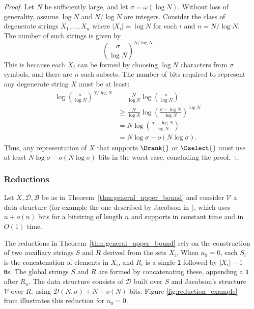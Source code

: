 \begin{proof}
    Let $N$ be sufficiently large, and let $\sigma = \omega(\log N)$. Without loss of generality, assume $\log N$ and $N / \log N$ are integers. Consider the class of degenerate strings $X_1, \ldots, X_n$ where $|X_i| = \log N$ for each $i$ and $n = N / \log N$. The number of such strings is given by
    \begin{equation}
        \binom{\sigma}{\log N}^{N / \log N}
    \end{equation}
    This is because each $X_i$ can be formed by choosing $\log N$ characters from $\sigma$ symbols, and there are $n$ such subsets. The number of bits required to represent any degenerate string $X$ must be at least:
    \begin{align*}
        \log \binom{\sigma}{\log N}^{N / \log N} & = \frac{N}{\log N} \log \binom{\sigma}{\log N}                                    \\
                                                 & \geq \frac{N}{\log N} \log \left( \frac{\sigma - \log N}{\log N} \right)^{\log N} \\
                                                 & = N \log \left( \frac{\sigma - \log N}{\log N} \right)                            \\
                                                 & = N \log \sigma - o(N \log \sigma).
    \end{align*}
    Thus, any representation of $X$ that supports $\Drank{}$ or $\Dselect{}$ must use at least $N \log \sigma - o(N \log \sigma)$ bits in the worst case, concluding the proof.
\end{proof}

\subsubsection{Reductions}{\label{sec:reductions}}

Let $X, \mathcal{D}, \mathcal{B}$ be as in Theorem~\ref{thm:general_upper_bound} and consider $\mathcal{V}$ a data structure (for example the one described by Jacobson in \cite{Jacobson}), which uses $n +o(n)$ bits for a bitstring of length $n$ and supports \Rank{} in constant time and \Select{} in $O(1)$ time.

\noindent The reductions in Theorem~\ref{thm:general_upper_bound} rely on the construction of two auxiliary strings $S$ and $R$ derived from the sets $X_i$. When $n_0 = 0$, each $S_i$ is the concatenation of elements in $X_i$, and $R_i$ is a single \texttt{1} followed by $|X_i| - 1$ \texttt{0}s. The global strings $S$ and $R$ are formed by concatenating these, appending a \texttt{1} after $R_n$. The data structure consists of $\mathcal{D}$ built over $S$ and Jacobson's structure $\mathcal{V}$ over $R$, using $\mathcal{D}(N,\sigma) + N + o(N)$ bits. Figure \ref{fig:reduction_example} from \cite{bille2023rank} illustrates this reduction for $n_0 = 0$.


